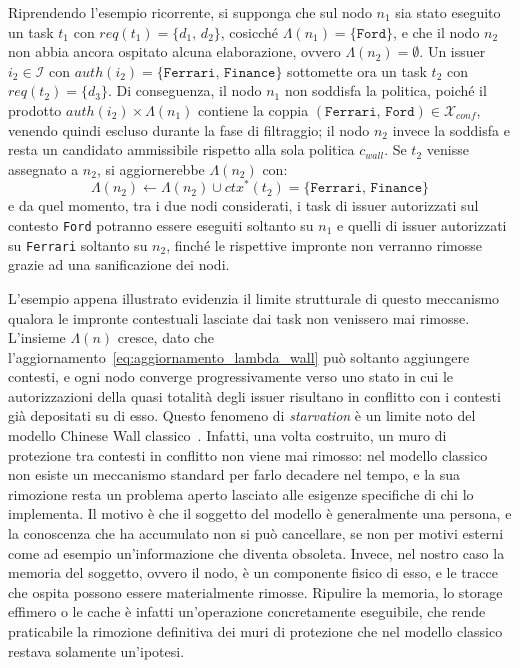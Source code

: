 Riprendendo l'esempio ricorrente, si supponga che sul nodo $n_1$ sia stato eseguito un task $t_1$ con $req(t_1) = \{d_1,\, d_2\}$, cosicché $\Lambda(n_1) = \{\mathtt{Ford}\}$, e che il nodo $n_2$ non abbia ancora ospitato alcuna elaborazione, ovvero $\Lambda(n_2) = \emptyset$. Un issuer $i_2 \in \mathcal{I}$ con $auth(i_2) = \{\mathtt{Ferrari},\, \mathtt{Finance}\}$ sottomette ora un task $t_2$ con $req(t_2) = \{d_3\}$. Di conseguenza, il nodo $n_1$ non soddisfa la politica, poiché il prodotto $auth(i_2) \times \Lambda(n_1)$ contiene la coppia $(\mathtt{Ferrari},\, \mathtt{Ford}) \in \mathcal{X}_{conf}$, venendo quindi escluso durante la fase di filtraggio; il nodo $n_2$ invece la soddisfa e resta un candidato ammissibile rispetto alla sola politica $c_{wall}$. Se $t_2$ venisse assegnato a $n_2$, si aggiornerebbe $\Lambda(n_2)$ con:
\begin{equation}
    \Lambda(n_2) \leftarrow \Lambda(n_2) \cup ctx^*(t_2) = \{\mathtt{Ferrari},\, \mathtt{Finance}\}
\end{equation}
e da quel momento, tra i due nodi considerati, i task di issuer autorizzati sul contesto \texttt{Ford} potranno essere eseguiti soltanto su $n_1$ e quelli di issuer autorizzati su \texttt{Ferrari} soltanto su $n_2$, finché le rispettive impronte non verranno rimosse grazie ad una sanificazione dei nodi.

L'esempio appena illustrato evidenzia il limite strutturale di questo meccanismo qualora le impronte contestuali lasciate dai task non venissero mai rimosse. L'insieme $\Lambda(n)$ cresce, dato che l'aggiornamento~\eqref{eq:aggiornamento_lambda_wall} può soltanto aggiungere contesti, e ogni nodo converge progressivamente verso uno stato in cui le autorizzazioni della quasi totalità degli issuer risultano in conflitto con i contesti già depositati su di esso. Questo fenomeno di \emph{starvation} è un limite noto del modello Chinese Wall classico~\cite{chinese-wall-brewer-nash, chinese-wall-kessler}. Infatti, una volta costruito, un muro di protezione tra contesti in conflitto non viene mai rimosso: nel modello classico non esiste un meccanismo standard per farlo decadere nel tempo, e la sua rimozione resta un problema aperto lasciato alle esigenze specifiche di chi lo implementa. Il motivo è che il soggetto del modello è generalmente una persona, e la conoscenza che ha accumulato non si può cancellare, se non per motivi esterni come ad esempio un'informazione che diventa obsoleta. Invece, nel nostro caso la memoria del soggetto, ovvero il nodo, è un componente fisico di esso, e le tracce che ospita possono essere materialmente rimosse. Ripulire la memoria, lo storage effimero o le cache è infatti un'operazione concretamente eseguibile, che rende praticabile la rimozione definitiva dei muri di protezione che nel modello classico restava solamente un'ipotesi.

